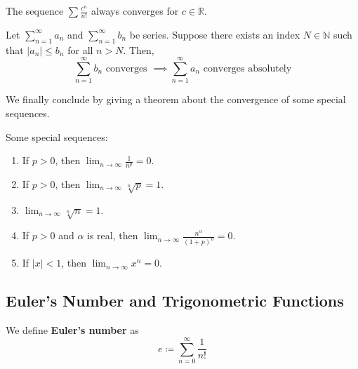   \begin{example}
    The sequence $\sum \frac{c^n}{n!}$ always converges for $c \in \mathbb{R}$. 
  \end{example}

  \begin{theorem}
    Let $\sum_{n=1}^\infty a_n$ and $\sum_{n=1}^\infty b_n$ be series. Suppose there exists an index $N \in \mathbb{N}$ such that $|a_n| \leq b_n$ for all $n>N$. Then, 
    \begin{equation}
      \sum_{n=1}^\infty b_n \text{ converges } \implies \sum_{n=1}^\infty a_n \text{ converges absolutely}
    \end{equation}
  \end{theorem}

  We finally conclude by giving a theorem about the convergence of some special sequences. 

  \begin{theorem}
    Some special sequences: 
    \begin{enumerate}
      \item If $p > 0$, then $\lim_{n \rightarrow \infty} \frac{1}{n^p} = 0$. 
      
      \item If $p > 0$, then $\lim_{n \rightarrow \infty} \sqrt[n]{p} = 1$. 

      \item $\lim_{n \rightarrow \infty} \sqrt[n]{n} = 1$. 

      \item If $p > 0$ and $\alpha$ is real, then $\lim_{n \rightarrow \infty} \frac{n^\alpha}{(1 + p)^n} = 0$. 
      
      \item If $|x| < 1$, then $\lim_{n \rightarrow \infty} x^n = 0$. 
    \end{enumerate}
  \end{theorem}

\subsection{Euler's Number and Trigonometric Functions} 

  \begin{definition}
    We define \textbf{Euler's number} as 
    \begin{equation}
      e \coloneqq \sum_{n=0}^\infty \frac{1}{n!}
    \end{equation}
  \end{definition}
  
